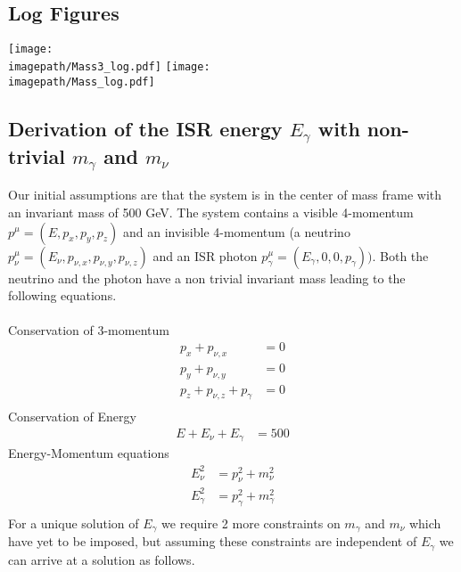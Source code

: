 \subsection{Log Figures}
\label{App:LogFigures}
\texttt{[image: \\imagepath/Mass3\_log.pdf]}
\texttt{[image: \\imagepath/Mass\_log.pdf]}

\subsection{Derivation of the ISR energy ${E}_{\gamma}$ with non-trivial ${m}_{\gamma}$ and ${m}_{\nu}$}
\label{App:Derivation}

Our initial assumptions are that the system is in the center of mass frame with an invariant mass of 500 GeV. The system contains a visible 4-momentum ${p}^{\mu} = ( E,  {p}_{x}, {p}_{y}, {p}_{z})$ and an invisible 4-momentum (a neutrino ${p}^{\mu}_{\nu} = ( {E}_{\nu},  {p}_{\nu,x}, {p}_{\nu,y}, {p}_{\nu,z})$ and an ISR photon $ {p}^{\mu}_{\gamma} = ( {E}_{\gamma}, 0, 0,  {p}_{\gamma}) )$. Both the neutrino and the photon have a non trivial invariant mass leading to the following equations.\\\\
Conservation of 3-momentum
\begin{align}
{p}_{x} + {p}_{\nu,x}&=0\\
{p}_{y} + {p}_{\nu,y}&=0\\
{p}_{z} + {p}_{\nu,z} + {p}_{\gamma} &= 0\\
 \end{align}
Conservation of Energy
 \begin{align}
E + {E}_{\nu} + {E}_{\gamma} &= 500
 \end{align}
Energy-Momentum equations
 \begin{align}
{E}_{\nu}^{2} &= {p}_{\nu}^{2} +{m}_{\nu}^{2}\\
{E}_{\gamma}^{2} &= {p}_{\gamma}^{2} +{m}_{\gamma}^{2}\\
 \end{align}
For a unique solution of ${E}_{\gamma}$ we require 2 more constraints on ${m}_{\gamma}$ and ${m}_{\nu}$ which have yet to be imposed, but assuming these constraints are independent of ${E}_{\gamma}$ we can arrive at a solution as follows.\\

